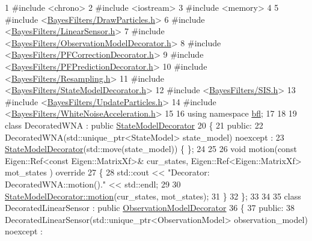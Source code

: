 \begin{DoxyCodeInclude}
1 \textcolor{preprocessor}{#include <chrono>}
2 \textcolor{preprocessor}{#include <iostream>}
3 \textcolor{preprocessor}{#include <memory>}
4 
5 \textcolor{preprocessor}{#include <\mbox{\hyperlink{DrawParticles_8h}{BayesFilters/DrawParticles.h}}>}
6 \textcolor{preprocessor}{#include <\mbox{\hyperlink{LinearSensor_8h}{BayesFilters/LinearSensor.h}}>}
7 \textcolor{preprocessor}{#include <\mbox{\hyperlink{ObservationModelDecorator_8h}{BayesFilters/ObservationModelDecorator.h}}>}
8 \textcolor{preprocessor}{#include <\mbox{\hyperlink{PFCorrectionDecorator_8h}{BayesFilters/PFCorrectionDecorator.h}}>}
9 \textcolor{preprocessor}{#include <\mbox{\hyperlink{PFPredictionDecorator_8h}{BayesFilters/PFPredictionDecorator.h}}>}
10 \textcolor{preprocessor}{#include <\mbox{\hyperlink{Resampling_8h}{BayesFilters/Resampling.h}}>}
11 \textcolor{preprocessor}{#include <\mbox{\hyperlink{StateModelDecorator_8h}{BayesFilters/StateModelDecorator.h}}>}
12 \textcolor{preprocessor}{#include <\mbox{\hyperlink{SIS_8h}{BayesFilters/SIS.h}}>}
13 \textcolor{preprocessor}{#include <\mbox{\hyperlink{UpdateParticles_8h}{BayesFilters/UpdateParticles.h}}>}
14 \textcolor{preprocessor}{#include <\mbox{\hyperlink{WhiteNoiseAcceleration_8h}{BayesFilters/WhiteNoiseAcceleration.h}}>}
15 
16 \textcolor{keyword}{using namespace }\mbox{\hyperlink{namespacebfl}{bfl}};
17 
18 
19 \textcolor{keyword}{class }DecoratedWNA : \textcolor{keyword}{public} \mbox{\hyperlink{classbfl_1_1StateModelDecorator}{StateModelDecorator}}
20 \{
21 \textcolor{keyword}{public}:
22     DecoratedWNA(std::unique\_ptr<StateModel> state\_model) noexcept :
23         \mbox{\hyperlink{classbfl_1_1StateModelDecorator}{StateModelDecorator}}(std::move(state\_model)) \{ \};
24 
25 
26     \textcolor{keywordtype}{void} motion(\textcolor{keyword}{const} Eigen::Ref<const Eigen::MatrixXf>& cur\_states, Eigen::Ref<Eigen::MatrixXf> mot\_states
      )\textcolor{keyword}{ override}
27 \textcolor{keyword}{    }\{
28         std::cout << \textcolor{stringliteral}{"Decorator: DecoratedWNA::motion()."} << std::endl;
29 
30         \mbox{\hyperlink{classbfl_1_1StateModelDecorator_a0a645d8be4085ec13d9715a41c84a9b3}{StateModelDecorator::motion}}(cur\_states, mot\_states);
31     \}
32 \};
33 
34 
35 \textcolor{keyword}{class }DecoratedLinearSensor : \textcolor{keyword}{public} \mbox{\hyperlink{classbfl_1_1ObservationModelDecorator}{ObservationModelDecorator}}
36 \{
37 \textcolor{keyword}{public}:
38     DecoratedLinearSensor(std::unique\_ptr<ObservationModel> observation\_model) noexcept :

\end{DoxyCodeInclude}
